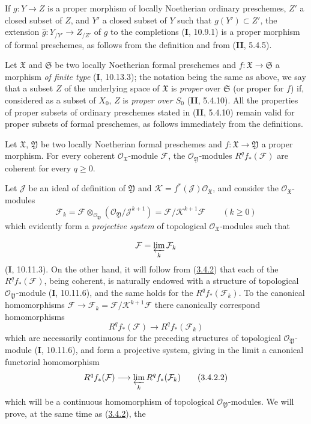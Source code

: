 \begin{env}[3.4.1]
If $g:Y\to Z$ is a proper morphism of locally Noetherian ordinary
preschemes, $Z'$ a closed subset of $Z$, and $Y'$ a closed subset of $Y$
such that $g(Y')\subset Z'$, the extension
$\widehat g:Y_{/Y'}\to Z_{/Z'}$ of $g$ to the completions (\textbf{I}, 10.9.1) is a
proper morphism of formal preschemes, as follows from the definition and
from (\textbf{II}, 5.4.5).

Let $\mathfrak X$ and $\mathfrak S$ be two locally Noetherian formal
preschemes and $f:\mathfrak X\to\mathfrak S$ a morphism \emph{of finite type}
(\textbf{I}, 10.13.3); the notation being the same as above, we say that a
subset $Z$ of the underlying space of $\mathfrak X$ is \emph{proper} over
$\mathfrak S$ (or proper for $f$) if, considered as a subset of $X_0$, $Z$
is \emph{proper over $S_0$} (\textbf{II}, 5.4.10). All the properties of proper
subsets of ordinary preschemes stated in (\textbf{II}, 5.4.10) remain valid
for proper subsets of formal preschemes, as follows immediately from the
definitions.
\end{env}

\begin{theorem}[3.4.2]
\label{III.3.4.2}
Let $\mathfrak X$, $\mathfrak Y$ be two locally Noetherian formal
preschemes and $f:\mathfrak X\to\mathfrak Y$ a proper morphism. For every
coherent $\mathcal O_{\mathfrak X}$-module $\mathcal F$, the
$\mathcal O_{\mathfrak Y}$-modules $R^qf_*(\mathcal F)$ are coherent for
every $q\geq0$.
\end{theorem}

Let $\mathcal J$ be an ideal of definition of $\mathfrak Y$ and
$\mathcal K=f^*(\mathcal J)\mathcal O_{\mathfrak X}$, and consider the
$\mathcal O_{\mathfrak X}$-modules
\[
\mathcal F_k=\mathcal F\otimes_{\mathcal O_{\mathfrak Y}}
(\mathcal O_{\mathfrak Y}/\mathcal J^{k+1})
=\mathcal F/\mathcal K^{k+1}\mathcal F\qquad(k\geq0)
\tag{3.4.2.1}\label{III.3.4.2.1}
\]
which evidently form a \emph{projective system} of topological
$\mathcal O_{\mathfrak X}$-modules such that

\[
\mathcal F=\varprojlim_k\mathcal F_k
\]
(\textbf{I}, 10.11.3). On the other hand, it will follow from
(\hyperref[III.3.4.2]{3.4.2}) that each of the $R^qf_*(\mathcal F)$, being
coherent, is naturally endowed with a structure of topological
$\mathcal O_{\mathfrak Y}$-module (\textbf{I}, 10.11.6), and the same holds
for the $R^qf_*(\mathcal F_k)$. To the canonical homomorphisms
$\mathcal F\to\mathcal F_k=\mathcal F/\mathcal K^{k+1}\mathcal F$
there canonically correspond homomorphisms
\[
R^qf_*(\mathcal F)\longrightarrow R^qf_*(\mathcal F_k)
\]
which are necessarily continuous for the preceding structures of topological
$\mathcal O_{\mathfrak Y}$-module (\textbf{I}, 10.11.6), and
form a projective system, giving in the limit a canonical functorial
homomorphism
\[
R^qf_*(\mathcal F)\longrightarrow\varprojlim_kR^qf_*(\mathcal F_k)
\tag{3.4.2.2}\label{III.3.4.2.2}
\]
which will be a continuous homomorphism of topological
$\mathcal O_{\mathfrak Y}$-modules. We will prove, at the same time as
(\hyperref[III.3.4.2]{3.4.2}), the

